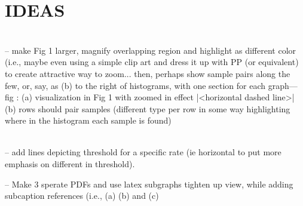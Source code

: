 \section*{IDEAS}
\noindent{}\\
-- make Fig 1 larger, magnify overlapping region and highlight as different color (i.e., maybe even using a simple clip art and dress it up with PP (or equivalent) to create attractive way to zoom... then, perhaps show sample pairs along the few, or, say, as (b) to the right of histograms, with one section for each graph--- fig : (a) visualization in Fig 1 with zoomed in effect |<horizontal dashed line>| (b) rows should pair samples (different type per row in some way highlighting where in the histogram each sample is found)

\noindent{}\\
-- add lines depicting threshold for a specific rate (ie horizontal to put more emphasis on different in threshold).

-- Make 3 sperate PDFs and use latex subgraphs tighten up view, while adding subcaption references (i.e., (a) (b) and (c)



